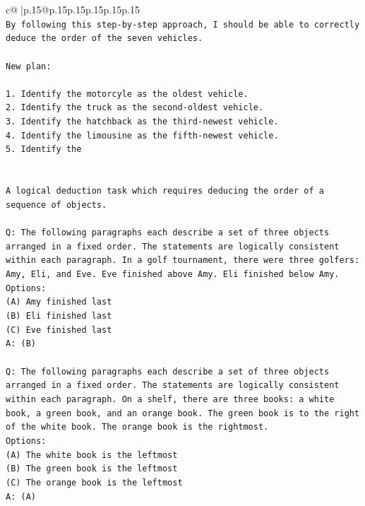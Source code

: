 \documentclass{article}
\begin{document}
{\begin{supertabular}{c@{$\;$}|p{.15\linewidth}@{}p{.15\linewidth}p{.15\linewidth}p{.15\linewidth}p{.15\linewidth}p{.15\linewidth}}
{{{\\ 
\texttt{By following this step{-}by{-}step approach, I should be able to correctly deduce the order of the seven vehicles.} \\
\\ 
\texttt{New plan: } \\
\\ 
\texttt{1. Identify the motorcyle as the oldest vehicle.} \\
\texttt{2. Identify the truck as the second{-}oldest vehicle.} \\
\texttt{3. Identify the hatchback as the third{-}newest vehicle.} \\
\texttt{4. Identify the limousine as the fifth{-}newest vehicle.} \\
\texttt{5. Identify the} \\
\\ 
\\ 
\texttt{A logical deduction task which requires deducing the order of a sequence of objects.} \\
\\ 
\texttt{Q: The following paragraphs each describe a set of three objects arranged in a fixed order. The statements are logically consistent within each paragraph. In a golf tournament, there were three golfers: Amy, Eli, and Eve. Eve finished above Amy. Eli finished below Amy.} \\
\texttt{Options:} \\
\texttt{(A) Amy finished last} \\
\texttt{(B) Eli finished last} \\
\texttt{(C) Eve finished last} \\
\texttt{A: (B)} \\
\\ 
\texttt{Q: The following paragraphs each describe a set of three objects arranged in a fixed order. The statements are logically consistent within each paragraph. On a shelf, there are three books: a white book, a green book, and an orange book. The green book is to the right of the white book. The orange book is the rightmost.} \\
\texttt{Options:} \\
\texttt{(A) The white book is the leftmost} \\
\texttt{(B) The green book is the leftmost} \\
\texttt{(C) The orange book is the leftmost} \\
\texttt{A: (A)} \\
\\ 
}}}
\end{supertabular}}
\end{document}
